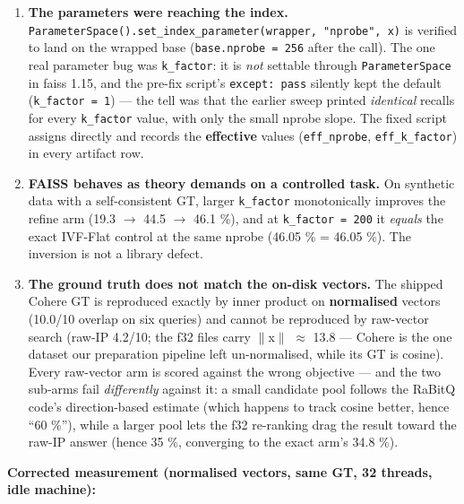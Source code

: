 \documentclass[
  10pt,
]{article}
\providecommand{\tightlist}{%
  \setlength{\itemsep}{0pt}\setlength{\parskip}{0pt}}
\begin{document}
\begin{enumerate}
\def\labelenumi{\arabic{enumi}.}
\tightlist
\item
  \textbf{The parameters were reaching the index.}
  \texttt{ParameterSpace().set\_index\_parameter(wrapper,\ "nprobe",\ x)}
  is verified to land on the wrapped base (\texttt{base.nprobe\ =\ 256}
  after the call). The one real parameter bug was \texttt{k\_factor}: it
  is \emph{not} settable through \texttt{ParameterSpace} in faiss 1.15,
  and the pre-fix script's \texttt{except:\ pass} silently kept the
  default (\texttt{k\_factor\ =\ 1}) --- the tell was that the earlier
  sweep printed \emph{identical} recalls for every \texttt{k\_factor}
  value, with only the small nprobe slope. The fixed script assigns
  directly and records the \textbf{effective} values
  (\texttt{eff\_nprobe}, \texttt{eff\_k\_factor}) in every artifact row.
\item
  \textbf{FAISS behaves as theory demands on a controlled task.} On
  synthetic data with a self-consistent GT, larger \texttt{k\_factor}
  monotonically improves the refine arm (19.3 $\rightarrow$ 44.5 $\rightarrow$ 46.1 \%), and at
  \texttt{k\_factor\ =\ 200} it \emph{equals} the exact IVF-Flat control
  at the same nprobe (46.05 \% = 46.05 \%). The inversion is not a
  library defect.
\item
  \textbf{The ground truth does not match the on-disk vectors.} The
  shipped Cohere GT is reproduced exactly by inner product on
  \textbf{normalised} vectors (10.0/10 overlap on six queries) and
  cannot be reproduced by raw-vector search (raw-IP 4.2/10; the f32
  files carry $\|$x$\|$ $\approx$ 13.8 --- Cohere is the one dataset our preparation
  pipeline left un-normalised, while its GT is cosine). Every raw-vector
  arm is scored against the wrong objective --- and the two sub-arms
  fail \emph{differently} against it: a small candidate pool follows the
  RaBitQ code's direction-based estimate (which happens to track cosine
  better, hence ``60 \%''), while a larger pool lets the f32 re-ranking
  drag the result toward the raw-IP answer (hence 35 \%, converging to
  the exact arm's 34.8 \%).
\end{enumerate}

\textbf{Corrected measurement (normalised vectors, same GT, 32 threads,
idle machine):}
\end{document}
